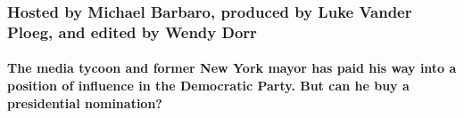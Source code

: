 \hypertarget{hosted-by-michael-barbaro-produced-by-luke-vander-ploeg-and-edited-by-wendy-dorr}{%
\subsubsection{Hosted by Michael Barbaro, produced by Luke Vander Ploeg,
and edited by Wendy
Dorr}\label{hosted-by-michael-barbaro-produced-by-luke-vander-ploeg-and-edited-by-wendy-dorr}}

\hypertarget{the-media-tycoon-and-former-new-york-mayor-has-paid-his-way-into-a-position-of-influence-in-the-democratic-party-but-can-he-buy-a-presidential-nomination}{%
\paragraph{The media tycoon and former New York mayor has paid his way
into a position of influence in the Democratic Party. But can he buy a
presidential
nomination?}\label{the-media-tycoon-and-former-new-york-mayor-has-paid-his-way-into-a-position-of-influence-in-the-democratic-party-but-can-he-buy-a-presidential-nomination}}

